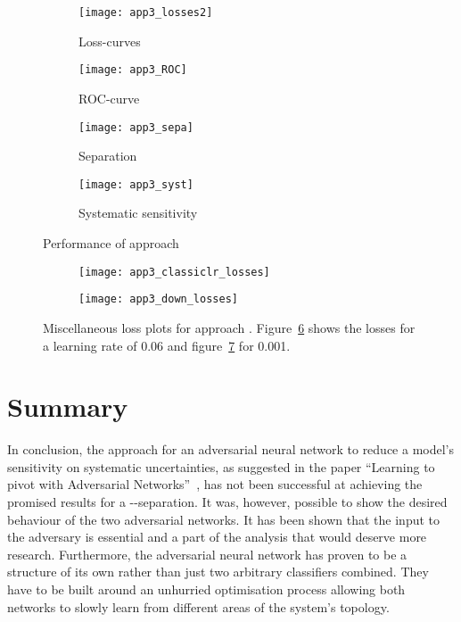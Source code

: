 \begin{figure}[htbp]
    \centering
    \begin{subfigure}[b]{0.45\textwidth}
        \texttt{[image: app3\_losses2]}
        \caption{Loss-curves}
        \label{fig:app3:losses}
    \end{subfigure}
\quad
    \begin{subfigure}[b]{0.45\textwidth}
        \texttt{[image: app3\_ROC]}
        \caption{ROC-curve}
        \label{fig:app3:ROC}
    \end{subfigure}

    \begin{subfigure}[b]{0.45\textwidth}
		\texttt{[image: app3\_sepa]}
		\caption{Separation}
		\label{fig:app3:sepa}
	\end{subfigure}
\quad
	\begin{subfigure}[b]{0.45\textwidth}
		\texttt{[image: app3\_syst]}
		\caption{Systematic sensitivity}
		\label{fig:app3:syst}
	\end{subfigure}
    \caption{Performance of approach }
	\label{fig:app3}
\end{figure}

\begin{figure}[htbp]
    \centering
    \begin{subfigure}[b]{0.45\textwidth}
        \texttt{[image: app3\_classiclr\_losses]}
        \caption{}
        \label{fig:app3:classiclr:losses}
    \end{subfigure}
\quad
    \begin{subfigure}[b]{0.45\textwidth}
        \texttt{[image: app3\_down\_losses]}
        \caption{}
        \label{fig:app3:down:losses}
    \end{subfigure}
    \caption{Miscellaneous loss plots for approach . Figure~\ref{fig:app3:classiclr:losses} shows the losses for a learning rate of \num{0.06} and figure~\ref{fig:app3:down:losses} for \num{0.001}.}
	\label{fig:app3:misc}
\end{figure}
\section{Summary}

In conclusion, the approach for an adversarial neural network to reduce a model's sensitivity on systematic uncertainties, as suggested in the paper \enquote{Learning to pivot with Adversarial Networks}~\cite{Louppe:2016ylz}, has not been successful at achieving the promised results for a \tW-\ttbar-separation. It was, however, possible to show the desired behaviour of the two adversarial networks. It has been shown that the input to the adversary is essential and a part of the analysis that would deserve more research. Furthermore, the adversarial neural network has proven to be a structure of its own rather than just two arbitrary classifiers combined. They have to be built around an unhurried optimisation process allowing both networks to slowly learn from different areas of the system's topology.
